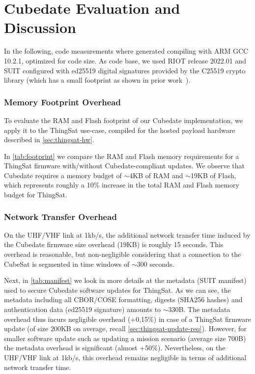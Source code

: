 \section{Cubedate Evaluation and Discussion}
\label{sec:evaluation}


In the following, code measurements where generated compiling with ARM GCC 10.2.1,
optimized for code size. As code base, we used RIOT release 2022.01 and SUIT configured
with ed25519 digital signatures provided by the C25519 crypto library (which has a small
footprint as shown in prior work~\cite{zandberg2019secure}).

\subsubsection{Memory Footprint Overhead}

To evaluate the RAM and Flash footprint of our Cubedate implementation, we apply it to
the ThingSat use-case, compiled for the hosted payload hardware described in \autoref{sec:thingsat-hw}.

In \autoref{tab:footprint} we compare the RAM and Flash memory requirements for a ThingSat firmware with/without Cubedate-compliant updates.
We observe that Cubedate requires a memory budget of $\sim$4KB of RAM and $\sim$19KB of Flash, which represents roughly a 10\%
increase in the total RAM and Flash memory budget for ThingSat.

\subsubsection{Network Transfer Overhead}
On the UHF/VHF link at 1kb/s, the additional network transfer time induced by the Cubedate firmware size overhead (19KB) is roughly 15 seconds.
This overhead is reasonable, but non-negligible considering that a connection to the CubeSat is segmented in time windows of $\sim$300 seconds.

Next, in \autoref{tab:manifest} we look in more details at the metadata (SUIT manifest) used to secure Cubedate software updates for ThingSat.
As we can see, the metadata including all CBOR/COSE formatting, digests (SHA256 hashes) and authentication data (ed25519 signature) amounts to $\sim$330B.
The metadata overhead thus incurs negligible overhead (+0,15\%) in case of a ThingSat firmware update (of size 200KB on average, recall
\autoref{sec:thingsat-update-req}). However, for smaller software update such as updating a mission scenario (average size 700B) the metadata
overhead is significant (almost +50\%). Nevertheless, on the UHF/VHF link at 1kb/s, this overhead remains negligible in terms of additional
network transfer time.

